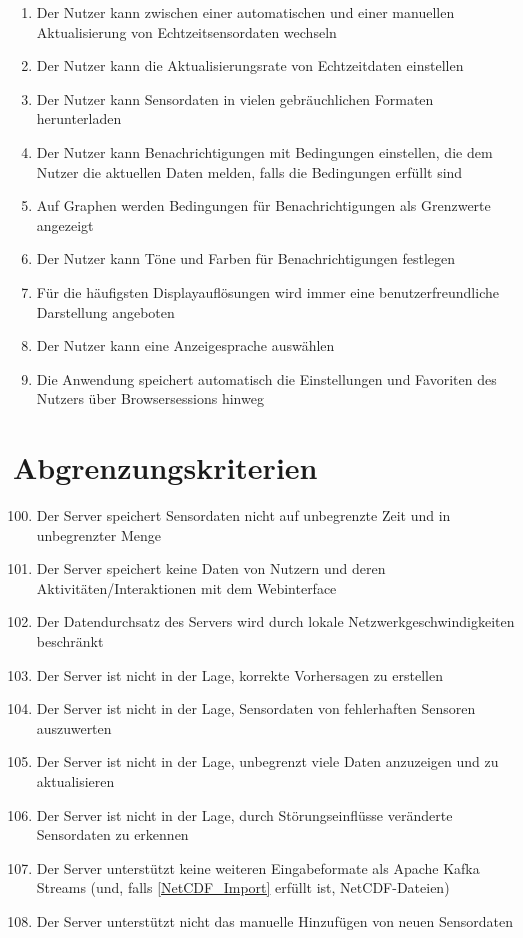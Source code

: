 \begin{enumerate}[label=\textbf{WK\arabic{enumi}0}]
	\item Der Nutzer kann zwischen einer automatischen und einer manuellen Aktualisierung von Echtzeitsensordaten wechseln
	\item Der Nutzer kann die Aktualisierungsrate von Echtzeitdaten einstellen
	\item Der Nutzer kann Sensordaten in vielen gebräuchlichen Formaten herunterladen
	\item Der Nutzer kann Benachrichtigungen mit Bedingungen einstellen, die dem Nutzer die aktuellen Daten melden, falls die Bedingungen erfüllt sind
	\item Auf Graphen werden Bedingungen für Benachrichtigungen als Grenzwerte angezeigt
	\item Der Nutzer kann Töne und Farben für Benachrichtigungen festlegen
	\item Für die häufigsten Displayauflösungen wird immer eine benutzerfreundliche Darstellung angeboten %
	\item Der Nutzer kann eine Anzeigesprache auswählen
	\item Die Anwendung speichert automatisch die Einstellungen und Favoriten des Nutzers über Browsersessions hinweg
\end{enumerate}

\section{Abgrenzungskriterien}
\begin{enumerate}[label=\textbf{AK\arabic{enumi}0}]
	\setcounter{enumi}{99}
	\item Der Server speichert Sensordaten nicht auf unbegrenzte Zeit und in unbegrenzter Menge
	\item Der Server speichert keine Daten von Nutzern und deren Aktivitäten/Interaktionen mit dem Webinterface
	\item Der Datendurchsatz des Servers wird durch lokale Netzwerkgeschwindigkeiten beschränkt
	\item Der Server ist nicht in der Lage, korrekte Vorhersagen zu erstellen
	\item Der Server ist nicht in der Lage, Sensordaten von fehlerhaften Sensoren auszuwerten
	\item Der Server ist nicht in der Lage, unbegrenzt viele Daten anzuzeigen und zu aktualisieren
	\item Der Server ist nicht in der Lage, durch Störungseinflüsse veränderte Sensordaten zu erkennen
	\item Der Server unterstützt keine weiteren Eingabeformate als Apache Kafka Streams (und, falls \ref{NetCDF_Import} erfüllt ist, NetCDF-Dateien)
	\item Der Server unterstützt nicht das manuelle Hinzufügen von neuen Sensordaten
\end{enumerate}